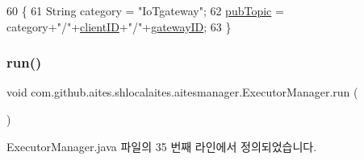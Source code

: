 \begin{DoxyCode}
60                                       \{
61         String category = \textcolor{stringliteral}{"IoTgateway"};
62         \mbox{\hyperlink{classcom_1_1github_1_1aites_1_1shlocalaites_1_1aitesmanager_1_1_executor_manager_aad22e0fb9a135ef6782182ed176d26c1}{pubTopic}} = category+\textcolor{stringliteral}{"/"}+\mbox{\hyperlink{classcom_1_1github_1_1aites_1_1shlocalaites_1_1aitesmanager_1_1_executor_manager_a13e89e7736ea367f5c0d986e92b417c9}{clientID}}+\textcolor{stringliteral}{"/"}+\mbox{\hyperlink{classcom_1_1github_1_1aites_1_1shlocalaites_1_1aitesmanager_1_1_executor_manager_a709d51cfc2be8075a91702475aa1374f}{gatewayID}};
63     \}
\end{DoxyCode}
\mbox{\label{classcom_1_1github_1_1aites_1_1shlocalaites_1_1aitesmanager_1_1_executor_manager_a9fe7a73a19b73a3b02a2a93b26f10605}} 
\subsubsection{\texorpdfstring{run()}{run()}}
{\footnotesize\ttfamily void com.\+github.\+aites.\+shlocalaites.\+aitesmanager.\+Executor\+Manager.\+run (\begin{DoxyParamCaption}{ }\end{DoxyParamCaption})}



Executor\+Manager.\+java 파일의 35 번째 라인에서 정의되었습니다.


